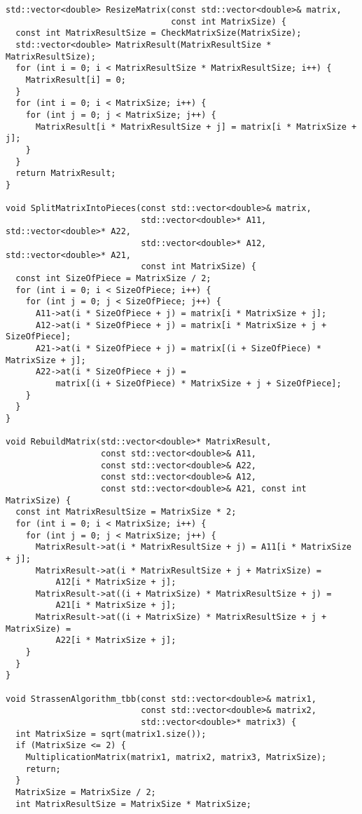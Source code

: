 \documentclass{report}
\begin{document}
\begin{lstlisting}
std::vector<double> ResizeMatrix(const std::vector<double>& matrix,
                                 const int MatrixSize) {
  const int MatrixResultSize = CheckMatrixSize(MatrixSize);
  std::vector<double> MatrixResult(MatrixResultSize * MatrixResultSize);
  for (int i = 0; i < MatrixResultSize * MatrixResultSize; i++) {
    MatrixResult[i] = 0;
  }
  for (int i = 0; i < MatrixSize; i++) {
    for (int j = 0; j < MatrixSize; j++) {
      MatrixResult[i * MatrixResultSize + j] = matrix[i * MatrixSize + j];
    }
  }
  return MatrixResult;
}

void SplitMatrixIntoPieces(const std::vector<double>& matrix,
                           std::vector<double>* A11, std::vector<double>* A22,
                           std::vector<double>* A12, std::vector<double>* A21,
                           const int MatrixSize) {
  const int SizeOfPiece = MatrixSize / 2;
  for (int i = 0; i < SizeOfPiece; i++) {
    for (int j = 0; j < SizeOfPiece; j++) {
      A11->at(i * SizeOfPiece + j) = matrix[i * MatrixSize + j];
      A12->at(i * SizeOfPiece + j) = matrix[i * MatrixSize + j + SizeOfPiece];
      A21->at(i * SizeOfPiece + j) = matrix[(i + SizeOfPiece) * MatrixSize + j];
      A22->at(i * SizeOfPiece + j) =
          matrix[(i + SizeOfPiece) * MatrixSize + j + SizeOfPiece];
    }
  }
}

void RebuildMatrix(std::vector<double>* MatrixResult,
                   const std::vector<double>& A11,
                   const std::vector<double>& A22,
                   const std::vector<double>& A12,
                   const std::vector<double>& A21, const int MatrixSize) {
  const int MatrixResultSize = MatrixSize * 2;
  for (int i = 0; i < MatrixSize; i++) {
    for (int j = 0; j < MatrixSize; j++) {
      MatrixResult->at(i * MatrixResultSize + j) = A11[i * MatrixSize + j];
      MatrixResult->at(i * MatrixResultSize + j + MatrixSize) =
          A12[i * MatrixSize + j];
      MatrixResult->at((i + MatrixSize) * MatrixResultSize + j) =
          A21[i * MatrixSize + j];
      MatrixResult->at((i + MatrixSize) * MatrixResultSize + j + MatrixSize) =
          A22[i * MatrixSize + j];
    }
  }
}

void StrassenAlgorithm_tbb(const std::vector<double>& matrix1,
                           const std::vector<double>& matrix2,
                           std::vector<double>* matrix3) {
  int MatrixSize = sqrt(matrix1.size());
  if (MatrixSize <= 2) {
    MultiplicationMatrix(matrix1, matrix2, matrix3, MatrixSize);
    return;
  }
  MatrixSize = MatrixSize / 2;
  int MatrixResultSize = MatrixSize * MatrixSize;


\end{lstlisting}
\end{document}
